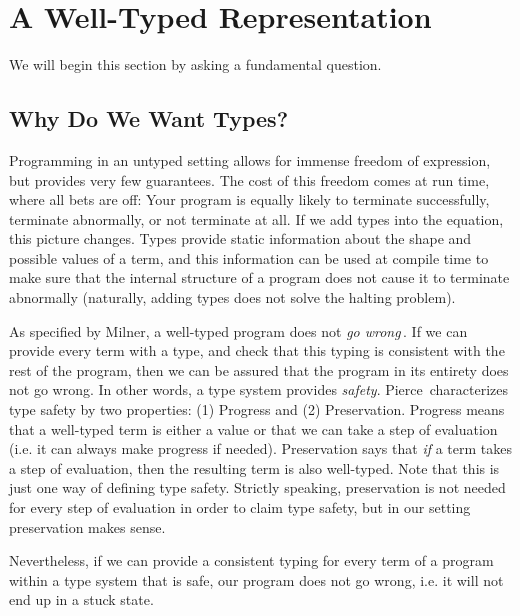 \section{A Well-Typed Representation}
\label{sec:a-well-typed-expression-language}

We will begin this section by asking a fundamental question.

\subsection{Why Do We Want Types?}
Programming in an untyped setting allows for immense freedom of expression, but provides very few guarantees. The cost of this freedom comes at run time, where all bets are off: Your program is equally likely to terminate successfully, terminate abnormally, or not terminate at all. If we add types into the equation, this picture changes. Types provide static information about the shape and possible values of a term, and this information can be used at compile time to make sure that the internal structure of a program does not cause it to terminate abnormally (naturally, adding types does not solve the halting problem).

As specified by Milner, a well-typed program does not \emph{go wrong}\,\cite{Milner78atheory}. If we can provide every term with a type, and check that this typing is consistent with the rest of the program, then we can be assured that the program in its entirety does not go wrong. In other words, a type system provides \emph{safety}. Pierce\,\cite[Section~8.3]{Pierce:TypeSystems} characterizes type safety by two properties: (1) Progress and (2) Preservation. Progress means that a well-typed term is either a value or that we can take a step of evaluation (i.e. it can always make progress if needed). Preservation says that \emph{if} a term takes a step of evaluation, then the resulting term is also well-typed. Note that this is just one way of defining type safety. Strictly speaking, preservation is not needed for every step of evaluation in order to claim type safety, but in our setting preservation makes sense.

Nevertheless, if we can provide a consistent typing for every term of a program within a type system that is safe, our program does not go wrong, i.e. it will not end up in a stuck state. 

